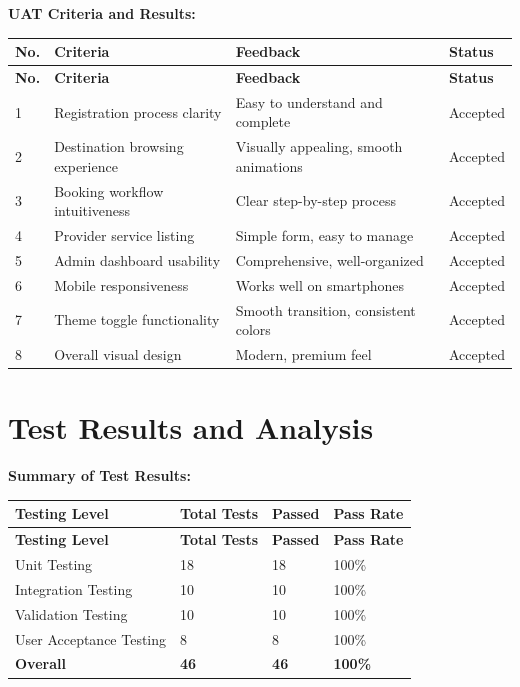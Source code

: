 \textbf{UAT Criteria and Results:}

\begin{longtable}{|p{0.5cm}|p{4.5cm}|p{4cm}|p{3.5cm}|}
\hline
\textbf{No.} & \textbf{Criteria} & \textbf{Feedback} & \textbf{Status} \\
\hline
\endfirsthead
\hline
\textbf{No.} & \textbf{Criteria} & \textbf{Feedback} & \textbf{Status} \\
\hline
\endhead
1 & Registration process clarity & Easy to understand and complete & Accepted \\
\hline
2 & Destination browsing experience & Visually appealing, smooth animations & Accepted \\
\hline
3 & Booking workflow intuitiveness & Clear step-by-step process & Accepted \\
\hline
4 & Provider service listing & Simple form, easy to manage & Accepted \\
\hline
5 & Admin dashboard usability & Comprehensive, well-organized & Accepted \\
\hline
6 & Mobile responsiveness & Works well on smartphones & Accepted \\
\hline
7 & Theme toggle functionality & Smooth transition, consistent colors & Accepted \\
\hline
8 & Overall visual design & Modern, premium feel & Accepted \\
\hline
\end{longtable}

\section{Test Results and Analysis}

\textbf{Summary of Test Results:}

\begin{longtable}{|p{4.5cm}|p{2.5cm}|p{2.5cm}|p{2.5cm}|}
\hline
\textbf{Testing Level} & \textbf{Total Tests} & \textbf{Passed} & \textbf{Pass Rate} \\
\hline
\endfirsthead
\hline
\textbf{Testing Level} & \textbf{Total Tests} & \textbf{Passed} & \textbf{Pass Rate} \\
\hline
\endhead
Unit Testing & 18 & 18 & 100\% \\
\hline
Integration Testing & 10 & 10 & 100\% \\
\hline
Validation Testing & 10 & 10 & 100\% \\
\hline
User Acceptance Testing & 8 & 8 & 100\% \\
\hline
\textbf{Overall} & \textbf{46} & \textbf{46} & \textbf{100\%} \\
\hline
\end{longtable}

